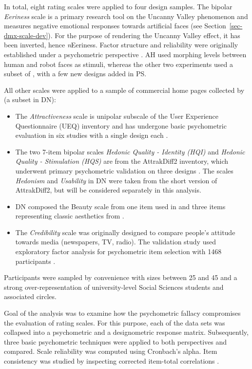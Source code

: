 \documentclass[
  authoryear,
  review]{elsarticle}
\begin{document}
In total, eight rating scales were applied to four design samples. The
bipolar \emph{Eeriness} scale is a primary research tool on the Uncanny
Valley phenomenon and measures negative emotional responses towards
artificial faces (see Section~\ref{sec-dmx-scale-dev}). For the purpose
of rendering the Uncanny Valley effect, it has been inverted, hence
\emph{n}Eeriness. Factor structure and reliability were originally
established under a psychometric perspective \citep{Ho2017}. AH used
morphing levels between human and robot faces as stimuli, whereas the
other two experiments used a subset of \citet{Mathur2016}, with a few
new designs added in PS.

All other scales were applied to a sample of commercial home pages
collected by \citet{Tuch2012} (a subset in DN):

\begin{itemize}
\item
  The \emph{Attractiveness} scale is unipolar subscale of the User
  Experience Questionnaire (UEQ) inventory and has undergone basic
  psychometric evaluation in six studies with a single design each
  \citep{Laugwitz2008}.
\item
  The two 7-item bipolar scales \emph{Hedonic Quality - Identity (HQI)}
  and \emph{Hedonic Quality - Stimulation (HQS)} are from the
  AttrakDiff2 inventory, which underwent primary psychometric validation
  on three designs \citep{Hassenzahl2003}. The scales \emph{Hedonism}
  and \emph{Usability} in DN were taken from the short version of
  AttrakDiff2, but will be considered separately in this analysis.
\item
  DN composed the Beauty scale from one item used in
  \citet{Hassenzahl2010} and three items representing classic aesthetics
  from \citet{Tractinsky2006}.
\item
  The \emph{Credibility} scale was originally designed to compare
  people's attitude towards media (newspapers, TV, radio). The
  validation study used exploratory factor analysis for psychometric
  item selection with 1468 participants \citep{Gaziano1986}.
\end{itemize}

Participants were sampled by convenience with sizes between 25 and 45
and a strong over-representation of university-level Social Sciences
students and associated circles.

Goal of the analysis was to examine how the psychometric fallacy
compromises the evaluation of rating scales. For this purpose, each of
the data sets was collapsed into a psychometric and a designometric
response matrix. Subsequently, three basic psychometric techniques were
applied to both perspectives and compared. Scale reliability was
computed using Cronbach's alpha. Item consistency was studied by
inspecting corrected item-total correlations \citep{Psych}.
\end{document}
